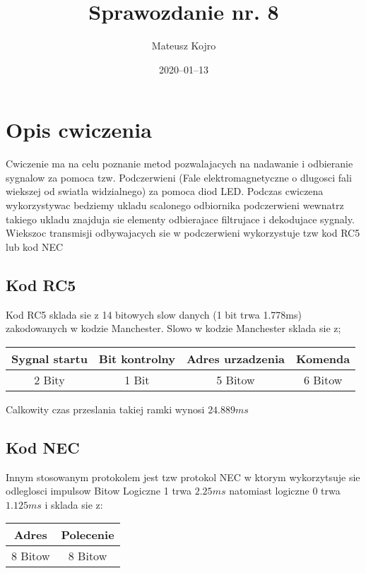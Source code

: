 \documentclass{article}
\title{Sprawozdanie nr. 8}
\author{Mateusz Kojro}
\date{2020–01–13}
\begin{document}
\maketitle


\section{Opis cwiczenia}

Cwiczenie ma na celu poznanie metod pozwalajacych na nadawanie i odbieranie sygnalow za pomoca tzw. Podczerwieni
(Fale elektromagnetyczne o dlugosci fali wiekszej od swiatla widzialnego) za pomoca diod LED. 
Podczas cwiczena wykorzystywac bedziemy ukladu scalonego odbiornika podczerwieni wewnatrz takiego ukladu 
znajduja sie elementy odbierajace filtrujace i dekodujace sygnaly. Wiekszoc transmisji odbywajacych sie w podczerwieni wykorzystuje tzw kod RC5 lub kod NEC

\subsection{Kod RC5}

Kod RC5 sklada sie z 14 bitowych slow danych (1 bit trwa 1.778ms) zakodowanych w kodzie Manchester. Slowo w kodzie Manchester sklada sie z;

\begin{center}
  \begin{tabular}{ |c|c|c|c| } 
  \hline
  Sygnal startu & Bit kontrolny & Adres urzadzenia & Komenda   \\
  \hline
  2 Bity & 1 Bit & 5 Bitow & 6 Bitow\\ 
  \hline
  \end{tabular}
\end{center}

Calkowity czas przeslania takiej ramki wynosi $ 24.889ms $

\subsection{Kod NEC}

Innym stosowanym protokolem jest tzw protokol NEC w ktorym wykorzytsuje sie odleglosci impulsow Bitow
Logiczne 1 trwa $2.25ms$ natomiast logiczne 0 trwa $1.125ms$ i sklada sie z:

\begin{center}
  \begin{tabular}{ |c|c| } 
  \hline
  Adres & Polecenie \\
  \hline
  8 Bitow & 8 Bitow \\ 
  \hline
  \end{tabular}
\end{center}
\end{document}
